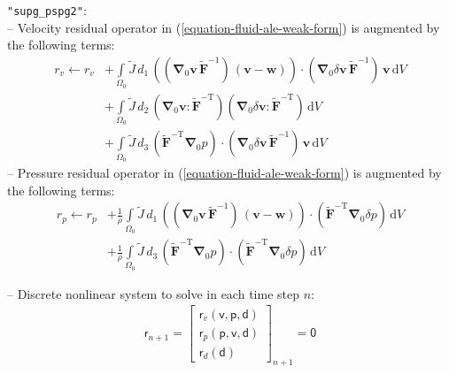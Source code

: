 \documentclass[a4paper,12pt]{report}
\newcommand{\bs}[1]{\boldsymbol{#1}}
\newcommand{\Om}{\mathit{\Omega}}
\newcommand{\ROP}{\bs{\mathsf{r}}}
\begin{document}
\verb."supg_pspg2".:\\
-- Velocity residual operator in (\ref{equation-fluid-ale-weak-form}) is augmented by the following terms:
\begin{equation}
\begin{aligned}
r_v \leftarrow r_v &+ \int\limits_{\Om_0} \widetilde{J}\,d_1\,((\bs{\nabla}_{0}\bs{v}\,\widetilde{\bs{F}}^{-1})\,(\bs{v}-\bs{w})) \cdot (\bs{\nabla}_{0}\delta\bs{v}\,\widetilde{\bs{F}}^{-1})\,\bs{v}\,\mathrm{d}V \\
& + \int\limits_{\Om_0} \widetilde{J}\,d_2\,(\bs{\nabla}_{0}\bs{v} : \widetilde{\bs{F}}^{-\mathrm{T}}) (\bs{\nabla}_{0}\delta\bs{v} : \widetilde{\bs{F}}^{-\mathrm{T}})\,\mathrm{d}V\\
&+ \int\limits_{\Om_0} \widetilde{J}\,d_3\,(\widetilde{\bs{F}}^{-\mathrm{T}}\bs{\nabla}_{0}p) \cdot (\bs{\nabla}_{0}\delta\bs{v}\,\widetilde{\bs{F}}^{-1})\,\bs{v}\,\mathrm{d}V
\end{aligned}
\end{equation}
-- Pressure residual operator in (\ref{equation-fluid-ale-weak-form}) is augmented by the following terms:
\begin{equation}
\begin{aligned}
r_p \leftarrow r_p &+ \frac{1}{\rho}\int\limits_{\Om_0} \widetilde{J}\,d_1\,((\bs{\nabla}_{0}\bs{v}\,\widetilde{\bs{F}}^{-1})\,(\bs{v}-\bs{w})) \cdot (\widetilde{\bs{F}}^{-\mathrm{T}}\bs{\nabla}_{0}\delta p)\,\mathrm{d}V \\
&+ \frac{1}{\rho}\int\limits_{\Om_0} \widetilde{J}\,d_3\,(\widetilde{\bs{F}}^{-\mathrm{T}}\bs{\nabla}_{0}p) \cdot (\widetilde{\bs{F}}^{-\mathrm{T}}\bs{\nabla}_{0}\delta p)\,\mathrm{d}V
\end{aligned}
\end{equation}

-- Discrete nonlinear system to solve in each time step $n$:
\begin{equation}
\label{equation-nonlin-sys-fluid-ale}
\begin{aligned}
\ROP_{n+1} = \begin{bmatrix} \ROP_{v}(\bs{\mathsf{v}},\bs{\mathsf{p}},\bs{\mathsf{d}}) \\ \ROP_{p}(\bs{\mathsf{p}},\bs{\mathsf{v}},\bs{\mathsf{d}}) \\ \ROP_{d}(\bs{\mathsf{d}}) \end{bmatrix}_{n+1} = \bs{\mathsf{0}}
\end{aligned}
\end{equation}
\end{document}
